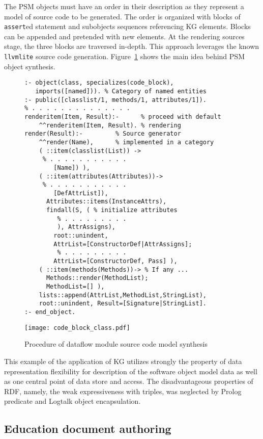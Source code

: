 \documentclass[a4paper]{jctart19a}
\begin{document}
The PSM objects must have an order in their description as they represent a model of source code to be generated.  The order is organized with blocks of \verb|assert|ed statement and subobjects sequences referencing KG elements.  Blocks can be appended and pretended with new elements.  At the rendering sources stage, the three blocks are traversed in-depth.  This approach leverages the known \verb|llvmlite| source code generation.  Figure~\ref{fig:block-seq} shows the main idea behind PSM object synthesis.
\begin{figure}[!b]
  \centering
\begin{multicols}{2}
\begin{verbatim}
:- object(class, specializes(code_block),
   imports([named])). % Category of named entities
:- public([classlist/1, methods/1, attributes/1]).
% . . . . . . . . . . . . . .
renderitem(Item, Result):-      % proceed with default
    ^^renderitem(Item, Result). % rendering
render(Result):-         % Source generator
    ^^render(Name),      % implemented in a category
    ( ::item(classlist(List)) ->
     % . . . . . . . . . . .
        [Name]) ),
    ( ::item(attributes(Attributes))->
     % . . . . . . . . . . .
        [DefAttrList]),
      Attributes::items(InstanceAttrs),
      findall(S, ( % initialize attributes
         % . . . . . . . . .
         ), AttrAssigns),
        root::unindent,
        AttrList=[ConstructorDef|AttrAssigns];
         % . . . . . . . . .
        AttrList=[ConstructorDef, Pass] ),
    ( ::item(methods(Methods))-> % If any ...
      Methods::render(MethodList);
      MethodList=[] ),
    lists::append(AttrList,MethodList,StringList),
    root::unindent, Result=[Signature|StringList].
:- end_object.
\end{verbatim}
      \texttt{[image: code\_block\_class.pdf]}
\end{multicols}
  \caption{Procedure of dataflow module source code model synthesis}
  \label{fig:block-seq}
\end{figure}
This example of the application of KG utilizes strongly the property of data representation flexibility for description of the software object model data as well as one central point of data store and access.  The disadvantageous properties of RDF, namely, the weak expressiveness with triples, was neglected by Prolog predicate and Logtalk object encapsulation.

\subsection{Education document authoring}
\label{sec:doc-impl}
\end{document}
